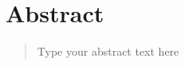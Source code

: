 

\chapter*{\centering Abstract}
\begin{quotation}
\noindent 

Type your abstract text here

\end{quotation}